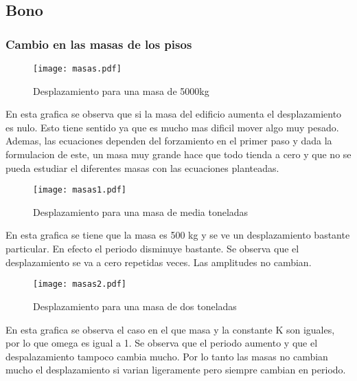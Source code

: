 \documentclass[11pt,letterpaper]{exam}
\begin{document}
\subsection{Bono}
\subsubsection{Cambio en las masas de los pisos}
\begin{figure}[H]
    \centering
    \texttt{[image: masas.pdf]}
    \caption{Desplazamiento para una masa de 5000kg}
    \label{fig:my_label}
\end{figure}
En esta grafica se observa que si la masa del edificio aumenta el desplazamiento es nulo. Esto tiene sentido ya que es mucho mas dificil mover algo muy pesado. Ademas, las ecuaciones dependen del forzamiento en el primer paso y dada la formulacion de este, un masa muy grande hace que todo tienda a cero y que no se pueda estudiar el diferentes masas con las ecuaciones planteadas. 
\begin{figure}[H]
    \centering
    \texttt{[image: masas1.pdf]}
    \caption{Desplazamiento para una masa de media toneladas}
    \label{fig:my_label}
\end{figure}
En esta grafica se tiene que la masa es 500 kg y se ve un desplazamiento bastante particular. En efecto el periodo disminuye bastante. Se observa que el desplazamiento se va a cero repetidas veces. Las amplitudes no cambian. 
\begin{figure}[H]
    \centering
    \texttt{[image: masas2.pdf]}
    \caption{Desplazamiento para una masa de dos toneladas}
    \label{fig:my_label}
\end{figure}
En esta grafica se observa el caso en el que masa y la constante K son iguales, por lo que omega es igual a 1. Se observa que el periodo aumento y que el despalazamiento tampoco cambia mucho. Por lo tanto las masas no cambian mucho el desplazamiento si varian ligeramente pero siempre cambian en periodo. 
\end{document}

